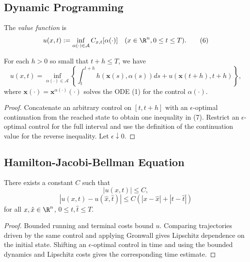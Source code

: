 \subsection{Dynamic Programming}

\begin{definition}
\label{def:value-function}
The \textit{value function} is
\[
u(x,t) := \inf_{\alpha(\cdot) \in \mathcal{A}} C_{x,t}[\alpha(\cdot)] \quad (x \in \R^n, 0 \le t \le T).
\tag{6}
\]
\end{definition}

\begin{theorem}
\label{thm:dynamic-programming-optimality-conditions}
For each $h > 0$ so small that $t + h \leq T$, we have
\[
u(x,t) = \inf_{\alpha(\cdot) \in \mathcal{A}} \left\{ \int_t^{t+h} h(\mathbf{x}(s), \alpha(s)) ds + u(\mathbf{x}(t+h), t+h) \right\},
\tag{7}
\]
where $\mathbf{x}(\cdot) = \mathbf{x}^{\alpha(\cdot)}(\cdot)$ solves the ODE (1) for the control $\alpha(\cdot)$.
\end{theorem}

\begin{proof}
\sketch Concatenate an arbitrary control on $[t,t+h]$ with an $\epsilon$-optimal continuation from the reached state to obtain one inequality in (7). Restrict an $\epsilon$-optimal control for the full interval and use the definition of the continuation value for the reverse inequality. Let $\epsilon\downarrow0$.
\end{proof}

\subsection{Hamilton-Jacobi-Bellman Equation}

\begin{lemma}
\label{lem:value-function-estimates}
There exists a constant $C$ such that
\[
|u(x,t)| \leq C,
\]
\[
|u(x,t) - u(\hat{x},\hat{t})| \leq C(|x - \hat{x}| + |t - \hat{t}|)
\]
for all $x, \hat{x} \in \R^n$, $0 \leq t, \hat{t} \leq T$.
\end{lemma}

\begin{proof}
\sketch Bounded running and terminal costs bound $u$. Comparing trajectories driven by the same control and applying Gronwall gives Lipschitz dependence on the initial state. Shifting an $\epsilon$-optimal control in time and using the bounded dynamics and Lipschitz costs gives the corresponding time estimate.
\end{proof}

